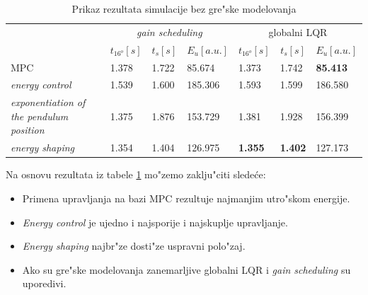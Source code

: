 \documentclass[a4paper,11pt]{article}
\theoremstyle{definition} \newtheorem{deff}{Definicija}[section]
\theoremstyle{definition} \newtheorem{prim}[deff]{Primer}
\theoremstyle{plain} \newtheorem{teor}[deff]{Teorema}
\begin{document}
	\begin{table}[!h]
		\begin{tabular}{lllllll}
			\cline{2-7}
			\multirow{2}{*}{} & \multicolumn{3}{c}{\emph{gain scheduling}} & \multicolumn{3}{c}{globalni LQR} \\ \cline{2-7} 
			& \multicolumn{1}{c}{$t_{16^o} [s]$} & \multicolumn{1}{c}{$t_s [s]$} & \multicolumn{1}{c}{$E_u [a.u.]$} & \multicolumn{1}{c}{$t_{16^o} [s]$} & \multicolumn{1}{c}{$t_s [s]$} & \multicolumn{1}{c}{$E_u [a.u.]$} \\ \hline
			MPC                
							 & 1.378      & 1.722      & 85.674      & 1.373   & 1.742  & \textbf{85.413}
							 \\ \hline
			\emph{energy control}
			                 &  1.539 & 1.600  & 185.306& 1.593   & 1.599  & 186.580
			                 \\ \hline
			\emph{exponentiation of the pendulum position}
			                 & 1.375  & 1.876  & 153.729& 1.381   & 1.928   & 156.399
			                 \\ \hline
			\emph{energy shaping}  
							 & 1.354  & 1.404  &126.975 & \textbf{1.355}   & \textbf{1.402}  & 127.173
			 				\\ \hline
		\end{tabular}
		\caption{Prikaz rezultata simulacije bez gre"ske modelovanja }
		\label{tab:no_error}
	\end{table}
	
	Na osnovu rezultata iz tabele \ref{tab:no_error} mo"zemo zaklju"citi slede\'ce: 
	\begin{itemize}
		\item Primena upravljanja na bazi MPC rezultuje najmanjim utro"skom energije.
		\item \emph{Energy control} je ujedno i najsporije i najskuplje upravljanje.
		\item \emph{Energy shaping} najbr"ze dosti"ze uspravni polo"zaj.
		\item Ako su gre"ske modelovanja zanemarljive globalni LQR i \emph{gain scheduling} su uporedivi.
	\end{itemize}
	\vspace{2cm}
	
\end{document}
